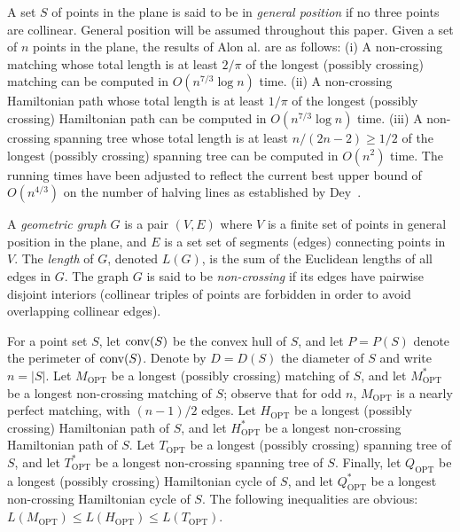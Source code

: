 \documentclass[proceedings]{stacs}
\begin{document}
\medskip
{}
A set $S$ of points in the plane is said to be in {\em  general
position} if no three points are collinear.
General position will be assumed throughout this paper.
Given a set of $n$ points in the plane, the results of Alon  al. are as follows:
{\rm (i)} A non-crossing matching whose total length is at least
$2/\pi$ of the longest (possibly crossing) matching
can be computed in $O(n^{7/3}\log{n})$ time.
{\rm (ii)} A non-crossing Hamiltonian path
whose total length is at least $1/\pi$ of the longest (possibly
crossing) Hamiltonian path can be computed in $O(n^{7/3}\log{n})$ time.
{\rm (iii)} A non-crossing spanning tree whose total length is at least
$n/(2n-2) \geq 1/2$ of the longest (possibly crossing) spanning tree
can be computed in $O(n^2)$ time.
The running times have been
adjusted to reflect the current best upper bound of $O(n^{4/3})$
on the number of halving lines as established by Dey~\cite{De98}.

A {\em geometric graph} $G$ is a pair $(V,E)$ where $V$ is a finite set
of points in general position in the plane, and $E$ is a set set of
segments (edges) connecting points in $V$. The {\em length} of $G$,
denoted $L(G)$, is the sum of the Euclidean lengths of all edges in
$G$. The graph $G$ is said to be {\em non-crossing} if its edges have
pairwise disjoint interiors (collinear triples of points are forbidden
in order to avoid overlapping collinear edges).

For a point set $S$, let ${\rm conv}(S)$ be the convex hull of $S$,
and let $P=P(S)$ denote the perimeter of ${\rm conv}(S)$.
Denote by $D=D(S)$ the diameter of $S$ and write $n=|S|$. Let
$M_\textrm{OPT}$ be a longest
(possibly crossing) matching of $S$, and let $M^*_\textrm{OPT}$ be a
longest non-crossing matching of $S$; observe that for odd $n$,
$M_\textrm{OPT}$ is a nearly perfect matching, with $(n-1)/2$ edges.
Let $H_\textrm{OPT}$ be a longest (possibly crossing) Hamiltonian path
of $S$, and let $H^*_\textrm{OPT}$ be a longest non-crossing Hamiltonian path
of $S$. Let $T_\textrm{OPT}$ be a longest (possibly crossing) spanning tree
of $S$, and let $T^*_\textrm{OPT}$ be a longest non-crossing spanning tree
of $S$. Finally, let $Q_\textrm{OPT}$ be a longest (possibly crossing)
Hamiltonian cycle of $S$, and let $Q^*_\textrm{OPT}$ be a longest
non-crossing Hamiltonian cycle of $S$. The following inequalities are obvious:
$L(M_\textrm{OPT}) \leq L(H_\textrm{OPT}) \leq L(T_\textrm{OPT})$.
\end{document}
